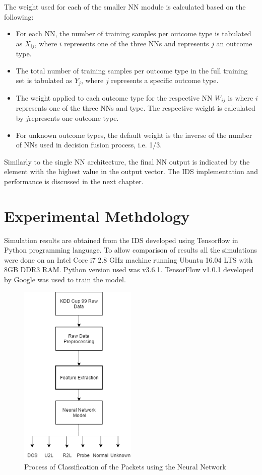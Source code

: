 \documentclass[12pt]{article}
\theoremstyle{definition}
\begin{document}
			The weight used for each of the smaller NN module is calculated based on the following:
			
			\begin{itemize}
				\item For each NN, the number of training samples per outcome type is
				tabulated as $X_{ij} $, where $ i $ represents one of the three NNs and represents $ j $ an outcome type.
				
				\item The total number of training samples per outcome type in the full training
				set is tabulated as $ Y_j $, where $ j $ represents a specific outcome type.
				
				\item The weight applied to each outcome type for the respective NN $ W_{ij} $ is
				where $ i $ represents one of the three NNs and type. The respective weight is calculated by $ j $represents one outcome type.
				\item For unknown outcome types, the default weight is the inverse of the
				number of NNs used in decision fusion process, i.e. 1/3.
			\end{itemize}
		
		Similarly to the single NN architecture, the final NN output is indicated by the
		element with the highest value in the output vector. The IDS implementation and performance is discussed in the next chapter.
	
	
	\cleardoublepage
	\section{Experimental Methdology}
	Simulation results are obtained from the IDS developed using Tensorflow in Python programming language. To allow comparison of results all the simulations were done on an Intel Core i7 2.8 GHz machine running Ubuntu 16.04 LTS with 8GB DDR3 RAM. Python version used was v3.6.1. TensorFlow v1.0.1 developed by Google was used to train the model.
	
	\begin{figure}[h]
		\centering
		\includegraphics[height=250pt]{pictures/classification-process.png}
		\caption{Process of Classification of the Packets using the Neural Network}
		\label{fig:classification-flow}
	\end{figure}
	
\end{document}
